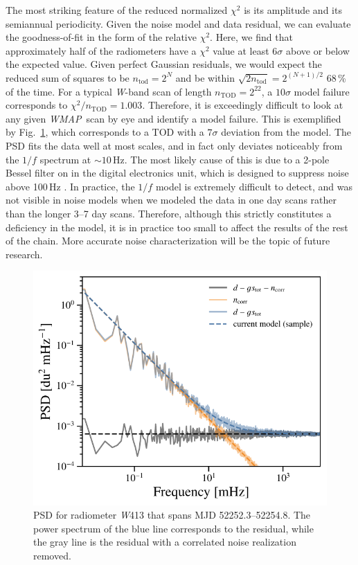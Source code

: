\documentclass[twocolumn]{../../common/aa}
\def\WMAP{\emph{WMAP}}
\newcommand{\W}[0]{\textit W}
\begin{document}
The most striking feature of the reduced normalized $\chi^2$ is its amplitude and its semiannual periodicity.
Given the noise model and data residual, we can evaluate the goodness-of-fit in the form of the relative $\chi^2$. Here, we find that approximately half of the radiometers have a $\chi^2$ value at least $6\sigma$ above or below the expected value. 
Given perfect Gaussian residuals, we would expect the reduced sum of squares to be $n_\mathrm{tod}=2^N$ and be within $\sqrt{2n_\mathrm{tod}}=2^{(N+1)/2}$ 68\,\% of the time. For a typical \W-band scan of length $n_\mathrm{TOD}=2^{22}$, a $10\sigma$ model failure corresponds to $\chi^2/n_\mathrm{TOD}=1.003$. Therefore, it is exceedingly difficult to look at any given \WMAP\ scan by eye and identify a model failure. This is exemplified by Fig.~\ref{fig:W413_psd}, which corresponds to a TOD with a $7\sigma$ deviation from the model. The PSD fits the data well at most scales, and in fact only deviates noticeably from the $1/f$ spectrum at $\sim10\,\mathrm{Hz}$. The most likely cause of this is due to a 2-pole Bessel filter on in the digital electronics unit, which is designed to suppress noise above 100\,Hz \citep{jarosik2003:MAP}. In practice, the $1/f$ model is extremely difficult to detect, and was not visible in noise models when we modeled the data in one day scans rather than the longer 3--7 day scans. Therefore, although this strictly constitutes a deficiency in the model, it is in practice too small to affect the results of the rest of the chain. More accurate noise characterization will be the topic of future research.

\begin{figure}
	\includegraphics[width=\columnwidth]{figures/ps_test_W4_det1.pdf}
	\caption{PSD for radiometer \W413 that spans MJD 52252.3--52254.8. The power spectrum of the blue line corresponds to the residual, while the gray line is the residual with a correlated noise realization removed.}
	\label{fig:W413_psd}
\end{figure}
\end{document}
